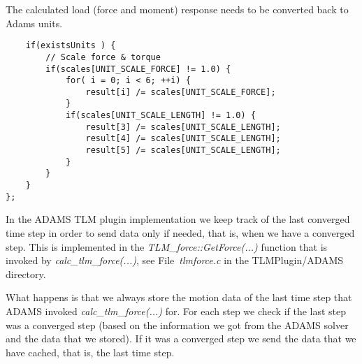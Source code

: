 The calculated load (force and moment) response needs to be converted back to Adams units.

{
\scriptsize
\begin{verbatim}
    if(existsUnits ) {
        // Scale force & torque
        if(scales[UNIT_SCALE_FORCE] != 1.0) {
            for( i = 0; i < 6; ++i) {
                result[i] /= scales[UNIT_SCALE_FORCE];
            }
            if(scales[UNIT_SCALE_LENGTH] != 1.0) {
                result[3] /= scales[UNIT_SCALE_LENGTH];
                result[4] /= scales[UNIT_SCALE_LENGTH];
                result[5] /= scales[UNIT_SCALE_LENGTH];
            }
        }
    }
};
\end{verbatim}
}


In the ADAMS TLM plugin implementation we keep track of the last converged time step in order to send data only if needed, that is, when we have a converged step. 
This is implemented in the {\em TLM\_force::GetForce(...)} function that is invoked by {\em calc\_tlm\_force(...)}, see File~{\em tlmforce.c} in the TLMPlugin/ADAMS directory.

What happens is that we always store the motion data of the last time step that ADAMS invoked {\em calc\_tlm\_force(...)} for. 
For each step we check if the last step was a converged step (based on the information we got from the ADAMS solver and the data that we stored).
If it was a converged step we send the data that we have cached, that is, the last time step.


